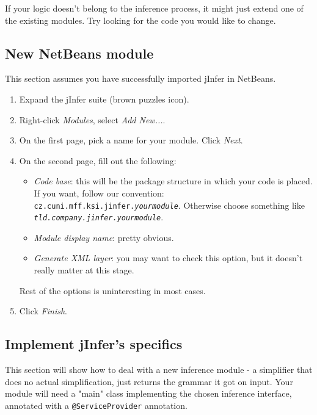 \documentclass[a4paper,10pt,oneside]{article}
\begin{document}
  \par 
    If your logic doesn't belong to the inference process, it might just extend
    one of the existing modules. Try looking for the code you would like to change.
  
\subsection*{New NetBeans module}
\par 
  This section assumes you have successfully imported jInfer in NetBeans.

\begin{enumerate}
  \item Expand the jInfer suite (brown puzzles icon).
  \item Right-click \textit{Modules}, select \textit{Add New...}.
  \item On the first page, pick a name for your module. Click \textit{Next}.
  \item On the second page, fill out the following:
    \begin{itemize}
      \item 
        \textit{Code base}: this will be the package structure in which your code is placed.
        If you want, follow our convention: \texttt{cz.cuni.mff.ksi.jinfer.\textit{yourmodule}}.
        Otherwise choose something like \texttt{\textit{tld.company.jinfer.yourmodule}}.
      
      \item \textit{Module display name}: pretty obvious.
      \item \textit{Generate XML layer}: you may want to check this option, but it doesn't really matter at this stage.
    \end{itemize}
    Rest of the options is uninteresting in most cases.
  
  \item Click \textit{Finish}.
\end{enumerate}
\subsection*{Implement jInfer's specifics}
\par 
This section will show how to deal with a new inference module - a simplifier
that does no actual simplification, just returns the grammar it got on input.
Your module will need a "main" class implementing the chosen inference
interface, annotated with a \texttt{@ServiceProvider} annotation.
\end{document}
